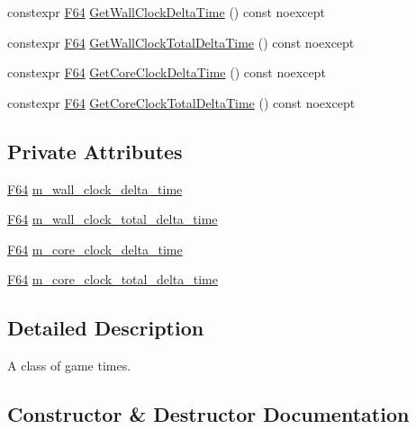 \begin{DoxyCompactItemize}
constexpr \hyperlink{namespacemage_ad26233bbec640deda836e572c1a23708}{F64} \hyperlink{classmage_1_1_game_time_a2ff13142221349d3368645bcbe0cfb8d}{Get\+Wall\+Clock\+Delta\+Time} () const noexcept
\item 
constexpr \hyperlink{namespacemage_ad26233bbec640deda836e572c1a23708}{F64} \hyperlink{classmage_1_1_game_time_a75c3675ead79cd32c9d77c70f3bd67ba}{Get\+Wall\+Clock\+Total\+Delta\+Time} () const noexcept
\item 
constexpr \hyperlink{namespacemage_ad26233bbec640deda836e572c1a23708}{F64} \hyperlink{classmage_1_1_game_time_a19333f5e42d9b968e0a172592f7d0bb8}{Get\+Core\+Clock\+Delta\+Time} () const noexcept
\item 
constexpr \hyperlink{namespacemage_ad26233bbec640deda836e572c1a23708}{F64} \hyperlink{classmage_1_1_game_time_a3331e36e04befebb4cebac79d12deb16}{Get\+Core\+Clock\+Total\+Delta\+Time} () const noexcept
\end{DoxyCompactItemize}
\subsection*{Private Attributes}
\begin{DoxyCompactItemize}
\item 
\hyperlink{namespacemage_ad26233bbec640deda836e572c1a23708}{F64} \hyperlink{classmage_1_1_game_time_afd4f74b4c930532dbb3b3259cbc068de}{m\+\_\+wall\+\_\+clock\+\_\+delta\+\_\+time}
\item 
\hyperlink{namespacemage_ad26233bbec640deda836e572c1a23708}{F64} \hyperlink{classmage_1_1_game_time_a5c2527df90b45a7b4e914c8811fcf52d}{m\+\_\+wall\+\_\+clock\+\_\+total\+\_\+delta\+\_\+time}
\item 
\hyperlink{namespacemage_ad26233bbec640deda836e572c1a23708}{F64} \hyperlink{classmage_1_1_game_time_abe875fff075fa87e4d029221f84b9f35}{m\+\_\+core\+\_\+clock\+\_\+delta\+\_\+time}
\item 
\hyperlink{namespacemage_ad26233bbec640deda836e572c1a23708}{F64} \hyperlink{classmage_1_1_game_time_ad030e0d01cfdfb3080caa74142cd6775}{m\+\_\+core\+\_\+clock\+\_\+total\+\_\+delta\+\_\+time}
\end{DoxyCompactItemize}


\subsection{Detailed Description}
A class of game times. 

\subsection{Constructor \& Destructor Documentation}
\hypertarget{classmage_1_1_game_time_af39a4fbd42467249874ba9372f463552}{}\label{classmage_1_1_game_time_af39a4fbd42467249874ba9372f463552} 

